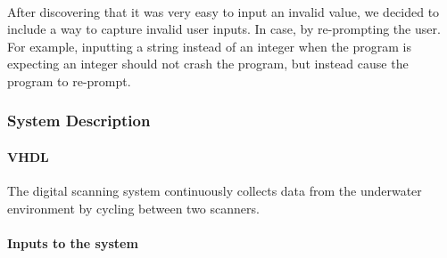 \documentclass{article}
\begin{document}
  \paragraph{} After discovering that it was very easy to input an invalid value, we decided to include a way to capture invalid user inputs. In case, by re-prompting the user. For example, inputting a string instead of an integer when the program is expecting an integer should not crash the program, but instead cause the program to re-prompt.


  \subsubsection{System Description}
  \paragraph{VHDL} The digital scanning system continuously collects data from the underwater environment by cycling between two scanners.

  \paragraph{Inputs to the system}
\end{document}
